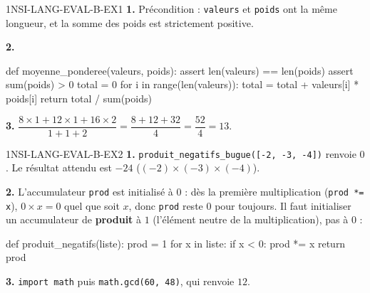 \begin{corrige}{1NSI-LANG-EVAL-B-EX1}
\textbf{1.} Précondition : \lstinline{valeurs} et \lstinline{poids} ont la même longueur,
et la somme des poids est strictement positive.

\textbf{2.}
\begin{python}
def moyenne_ponderee(valeurs, poids):
    assert len(valeurs) == len(poids)
    assert sum(poids) > 0
    total = 0
    for i in range(len(valeurs)):
        total = total + valeurs[i] * poids[i]
    return total / sum(poids)
\end{python}

\textbf{3.} $\dfrac{8\times1+12\times1+16\times2}{1+1+2}=\dfrac{8+12+32}{4}=\dfrac{52}{4}=13$.
\end{corrige}

\begin{corrige}{1NSI-LANG-EVAL-B-EX2}
\textbf{1.} \lstinline{produit_negatifs_bugue([-2, -3, -4])} renvoie $0$. Le résultat
attendu est $-24$ ($(-2)\times(-3)\times(-4)$).

\textbf{2.} L'accumulateur \lstinline{prod} est initialisé à $0$ : dès la première
multiplication (\lstinline{prod *= x}), $0\times x=0$ quel que soit $x$, donc
\lstinline{prod} reste $0$ pour toujours. Il faut initialiser un accumulateur de
\textbf{produit} à $1$ (l'élément neutre de la multiplication), pas à $0$ :
\begin{python}
def produit_negatifs(liste):
    prod = 1
    for x in liste:
        if x < 0:
            prod *= x
    return prod
\end{python}

\textbf{3.} \lstinline{import math} puis \lstinline{math.gcd(60, 48)}, qui renvoie $12$.
\end{corrige}
